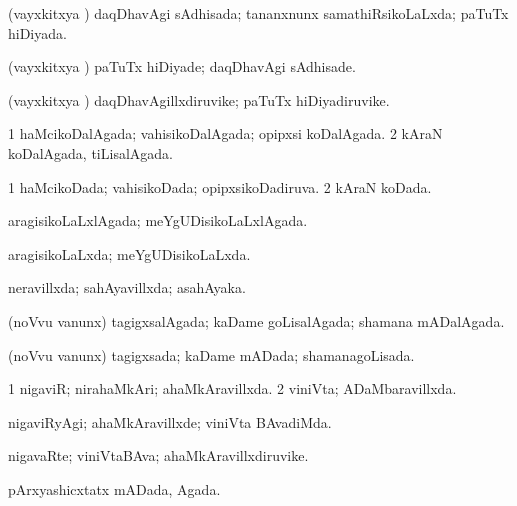 {\bentry
{} 
\gl{\gu}
\expl{}
\bmng
(vayxkitxya \vi) daqDhavAgi sAdhisada; tananxnunx samathiRsikoLaLxda; paTuTx hiDiyada. 
\emng
\eentry

\bentry
{} 
\gl{\kirxvi}
\expl{}
\bmng
(vayxkitxya \vi) paTuTx hiDiyade; daqDhavAgi sAdhisade. 
\emng
\eentry

\bentry
{} 
\gl{\nA}
\expl{}
\bmng
(vayxkitxya \vi) daqDhavAgillxdiruvike; paTuTx hiDiyadiruvike. 
\emng
\eentry

\bentry
{} 
\gl{\gu}
\expl{}
\bmng
\bnum
\num{1} haMcikoDalAgada; vahisikoDalAgada; opipxsi koDalAgada. 
\num{2} kAraN koDalAgada, tiLisalAgada. 
\enum
\emng
\eentry

\bentry
{} 
\gl{\gu}
\expl{}
\bmng
\bnum
\num{1} haMcikoDada; vahisikoDada; opipxsikoDadiruva. 
\num{2} kAraN koDada. 
\enum
\emng
\eentry

\bentry
{} 
\gl{\gu}
\expl{}
\bmng
aragisikoLaLxlAgada; meYgUDisikoLaLxlAgada. 
\emng
\eentry

\bentry
{} 
\gl{\gu}
\expl{}
\bmng
aragisikoLaLxda; meYgUDisikoLaLxda. 
\emng
\eentry

\bentry
{} 
\gl{\gu}
\expl{}
\bmng
neravillxda; sahAyavillxda; asahAyaka. 
\emng
\eentry

\bentry
{} 
\gl{\gu}
\expl{}
\bmng
(noVvu \mo vanunx) tagigxsalAgada; kaDame goLisalAgada; shamana mADalAgada. 
\emng
\eentry

\bentry
{} 
\gl{\gu}
\expl{}
\bmng
(noVvu \mo vanunx) tagigxsada; kaDame mADada; shamanagoLisada. 
\emng
\eentry

\bentry
{} 
\gl{\gu}
\expl{}
\bmng
\bnum
\num{1} nigaviR; nirahaMkAri; ahaMkAravillxda. 
\num{2} viniVta; ADaMbaravillxda. 
\enum
\emng
\eentry

\bentry
{} 
\gl{\kirxvi}
\expl{}
\bmng
nigaviRyAgi; ahaMkAravillxde; viniVta BAvadiMda. 
\emng
\eentry

\bentry
{} 
\gl{\nA}
\expl{}
\bmng
nigavaRte; viniVtaBAva; ahaMkAravillxdiruvike. 
\emng
\eentry

\bentry
{} 
\gl{\gu}
\expl{}
\bmng
pArxyashicxtatx mADada, Agada. 
\emng
\eentry

}
